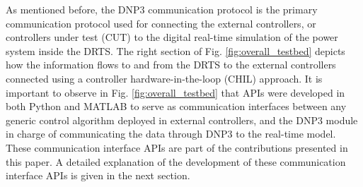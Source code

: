 As mentioned before, the DNP3 communication protocol is the primary communication protocol used for connecting the external controllers, or controllers under test (CUT) to the digital real-time simulation of the power system inside the DRTS. The right section of Fig. \ref{fig:overall_testbed} depicts how the information flows to and from the DRTS to the external controllers connected using a controller hardware-in-the-loop (CHIL) approach. It is important to observe in Fig. \ref{fig:overall_testbed} that APIs were developed in both Python and MATLAB to serve as communication interfaces between any generic control algorithm deployed in external controllers, and the DNP3 module in charge of communicating the data through DNP3 to the real-time model. These communication interface APIs are part of the contributions presented in this paper. A detailed explanation of the development of these communication interface APIs is given in the next section.